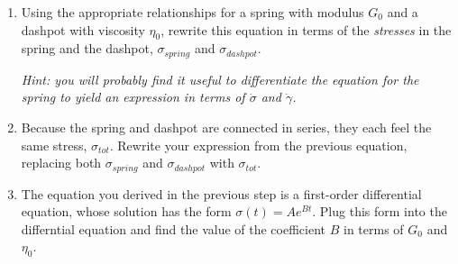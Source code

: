 \begin{activity}
\begin{exercises}
\begin{enumerate}
				\item Using the appropriate relationships for a spring with modulus $G_0$ and a dashpot with viscosity $\eta_0$, rewrite this equation in terms of the \emph{stresses} in the spring and the dashpot, $\sigma_{spring}$ and $\sigma_{dashpot}$.
				
					\emph{Hint: you will probably find it useful to differentiate the equation for the spring to yield an expression in terms of $\dot\sigma$ and $\dot\gamma$.}
				
					\begin{solution}\end{solution}
					
				\item Because the spring and dashpot are connected in series, they each feel the same stress, $\sigma_{tot}$.  Rewrite your expression from the previous equation, replacing both $\sigma_{spring}$ and $\sigma_{dashpot}$ with $\sigma_{tot}$.
				
					\begin{solution}\end{solution}			
				
				
				\item The equation you derived in the previous step is a first-order differential equation, whose solution has the form $\sigma(t) = A e^{Bt}$.  Plug this form into the differntial equation and find the value of the coefficient $B$ in terms of $G_0$ and $\eta_0$.
				
					\begin{solution}\end{solution} 
					

\end{enumerate}
\end{exercises}
\end{activity}
